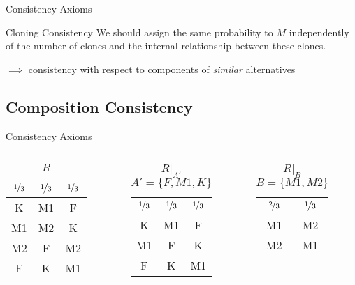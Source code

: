 \documentclass{beamer}
\theoremstyle{definition}
\begin{document}
\begin{frame}{Consistency Axioms}
\begin{block}{Cloning Consistency}
We should assign the same probability to $M$ independently of the number of clones and the internal relationship between these clones.

$\implies$ consistency with respect to components of \emph{similar} alternatives
\end{block}
\end{frame}

\subsection{Composition Consistency}

\begin{frame}{Consistency Axioms}
\begin{columns}
\begin{column}{0.33\textwidth}
\begin{center}\begin{table}\begin{tabular}{ c|c|c }
 $\nicefrac{1}{3}$ & $\nicefrac{1}{3}$ & $\nicefrac{1}{3}$ \\
 \hline\hline
 K & M1 & F \\
 M1 & M2 & K \\
 M2 & F & M2 \\
 F & K & M1 \\
\end{tabular}\caption{$R$}\end{table}\end{center}
\end{column}
\begin{column}{0.33\textwidth}
\begin{center}\begin{table}\begin{tabular}{ c|c|c }
 $\nicefrac{1}{3}$ & $\nicefrac{1}{3}$ & $\nicefrac{1}{3}$ \\
 \hline\hline
 K & M1 & F \\
 M1 & F & K \\
 F & K & M1 \\
\end{tabular}\caption{$R|_{A'}$ \\ $A' = \{F, M1, K\}$}\end{table}\end{center}
\end{column}
\begin{column}{0.33\textwidth}
\begin{center}\begin{table}\begin{tabular}{ c|c }
 $\nicefrac{2}{3}$ & $\nicefrac{1}{3}$ \\
 \hline\hline
 M1 & M2 \\
 M2 & M1 \\
\end{tabular}\caption{$R|_B$ \\ $B = \{M1, M2\}$}\end{table}\end{center}
\end{column}
\end{columns}


\end{frame}
\end{document}
